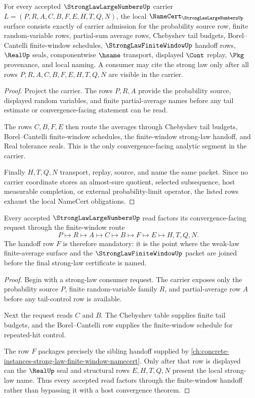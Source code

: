 \begin{theorem}
\label{thm:strong-law-large-numbers-namecert-obligations}
For every accepted $\StrongLawLargeNumbersUp$ carrier $L=(P,R,A,C,B,F,E,H,T,Q,N)$, the local $\NameCert_{\StrongLawLargeNumbersUp}$ surface consists exactly of carrier admission for the probability source row, finite random-variable rows, partial-sum average rows, Chebyshev tail budgets, Borel--Cantelli finite-window schedules, $\StrongLawFiniteWindowUp$ handoff rows, $\RealUp$ seals, componentwise $\hsame$ transport, displayed $\Cont$ replay, $\Pkg$ provenance, and local naming. A consumer may cite the strong law only after all rows $P,R,A,C,B,F,E,H,T,Q,N$ are visible in the carrier.
\end{theorem}
\begin{proof}
Project the carrier. The rows $P,R,A$ provide the probability source, displayed random variables, and finite partial-average names before any tail estimate or convergence-facing statement can be read.

The rows $C,B,F,E$ then route the averages through Chebyshev tail budgets, Borel--Cantelli finite-window schedules, the finite-window strong-law handoff, and Real tolerance seals. This is the only convergence-facing analytic segment in the carrier.

Finally $H,T,Q,N$ transport, replay, source, and name the same packet. Since no carrier coordinate stores an almost-sure quotient, selected subsequence, host measurable completion, or external probability-limit operator, the listed rows exhaust the local NameCert obligations.
\end{proof}

\begin{theorem}
\label{thm:strong-law-large-numbers-finite-window-handoff}
Every accepted $\StrongLawLargeNumbersUp$ read factors its convergence-facing request through the finite-window route
$$
P\longmapsto R\longmapsto A\longmapsto C\longmapsto B\longmapsto F\longmapsto E\longmapsto H,T,Q,N.
$$
The handoff row $F$ is therefore mandatory: it is the point where the weak-law finite-average surface and the $\StrongLawFiniteWindowUp$ packet are joined before the final strong-law certificate is named.
\end{theorem}
\begin{proof}
Begin with a strong-law consumer request. The carrier exposes only the probability source $P$, finite random-variable family $R$, and partial-average row $A$ before any tail-control row is available.

Next the request reads $C$ and $B$. The Chebyshev table supplies finite tail budgets, and the Borel--Cantelli row supplies the finite-window schedule for repeated-hit control.

The row $F$ packages precisely the sibling handoff supplied by \autoref{ch:concrete-instances-strong-law-finite-window-namecert}. Only after that row is displayed can the $\RealUp$ seal and structural rows $E,H,T,Q,N$ present the local strong-law name. Thus every accepted read factors through the finite-window handoff rather than bypassing it with a host convergence theorem.
\end{proof}

